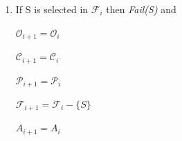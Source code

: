 \begin{defn}
\begin{enumerate}
\begin{enumerate}
\begin{enumerate}
\begin{enumerate}
\begin{multicols}{3}
$\mathcal{C}_{i+1}=\mathcal{C}_i \cup \{\sigma\}$

\columnbreak

$\mathcal{P}_{i+1}=\mathcal{P}_i \cup \{\bar{\sigma}\}$

$\mathcal{F}_{i+1}=\mathcal{F}_i \cup \{u(S)\}$

\columnbreak

$A_{i+1}=A_i$

\end{multicols}
\item if $\bar{\sigma}$ is an assumption, then
\begin{multicols}{3}
$\mathcal{O}_{i+1}=\mathcal{O}_i-\{S\}$

$\mathcal{C}_{i+1}=\mathcal{C}_i \cup \{\sigma\}$

\columnbreak

$\mathcal{P}_{i+1}=\mathcal{P}_i$

$\mathcal{F}_{i+1}=\mathcal{F}_i \cup \{u(S)\}$

\columnbreak

$A_{i+1}=A_i \cup \{\bar{\sigma}\}$

\end{multicols}
\end{enumerate}
\end{enumerate}
\item if $\sigma$ is not an assumption, then
\begin{multicols}{3}
$\mathcal{P}_{i+1}=\mathcal{P}_i$

$A_{i+1}=A_i$

$\mathcal{C}_{i+1}=\mathcal{C}_i$
\end{multicols}
$\mathcal{F}_{i+1}=\mathcal{F}_i\cup\{S-\{\sigma\}\cup R | \sigma \leftarrow R \in \mathcal{R}$ and $R \cap \mathcal{C}_i \neq \{\}\}$

$\mathcal{O}_{i+1}=\mathcal{O}_i-\{S\}\cup \{S-\{\sigma\} \cup R | \sigma \leftarrow R \in \mathcal{R}$ and $R \cap \mathcal{C}_i=\{\}\}$
\end{enumerate}
\item If S is selected in $\mathcal{F}_i$ then \emph{Fail(S)} and 
\begin{multicols}{3}
$\mathcal{O}_{i+1}=\mathcal{O}_i$

$\mathcal{C}_{i+1}=\mathcal{C}_i$

\columnbreak

$\mathcal{P}_{i+1}=\mathcal{P}_i$

$\mathcal{F}_{i+1}=\mathcal{F}_i-\{S\} $

\columnbreak

$A_{i+1}=A_i $

\end{multicols}
\end{enumerate}

\end{defn}

